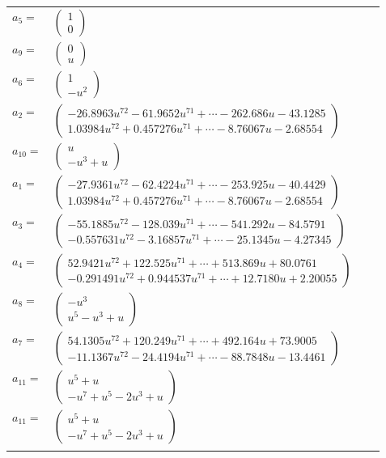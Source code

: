 \documentclass[1p]{elsarticle_modified}
\theoremstyle{definition}
\begin{document}
\begin{tabular}{m{7pt} m{180pt} m{7pt} m{180pt} }
\flushright $a_{5}=$&$\begin{pmatrix}1\\0\end{pmatrix}$ \\
\flushright $a_{9}=$&$\begin{pmatrix}0\\u\end{pmatrix}$ \\
\flushright $a_{6}=$&$\begin{pmatrix}1\\- u^2\end{pmatrix}$ \\
\flushright $a_{2}=$&$\begin{pmatrix}-26.8963 u^{72}-61.9652 u^{71}+\cdots-262.686 u-43.1285\\1.03984 u^{72}+0.457276 u^{71}+\cdots-8.76067 u-2.68554\end{pmatrix}$ \\
\flushright $a_{10}=$&$\begin{pmatrix}u\\- u^3+u\end{pmatrix}$ \\
\flushright $a_{1}=$&$\begin{pmatrix}-27.9361 u^{72}-62.4224 u^{71}+\cdots-253.925 u-40.4429\\1.03984 u^{72}+0.457276 u^{71}+\cdots-8.76067 u-2.68554\end{pmatrix}$ \\
\flushright $a_{3}=$&$\begin{pmatrix}-55.1885 u^{72}-128.039 u^{71}+\cdots-541.292 u-84.5791\\-0.557631 u^{72}-3.16857 u^{71}+\cdots-25.1345 u-4.27345\end{pmatrix}$ \\
\flushright $a_{4}=$&$\begin{pmatrix}52.9421 u^{72}+122.525 u^{71}+\cdots+513.869 u+80.0761\\-0.291491 u^{72}+0.944537 u^{71}+\cdots+12.7180 u+2.20055\end{pmatrix}$ \\
\flushright $a_{8}=$&$\begin{pmatrix}- u^3\\u^5- u^3+u\end{pmatrix}$ \\
\flushright $a_{7}=$&$\begin{pmatrix}54.1305 u^{72}+120.249 u^{71}+\cdots+492.164 u+73.9005\\-11.1367 u^{72}-24.4194 u^{71}+\cdots-88.7848 u-13.4461\end{pmatrix}$ \\
\flushright $a_{11}=$&$\begin{pmatrix}u^5+u\\- u^7+u^5-2 u^3+u\end{pmatrix}$\\ \flushright $a_{11}=$&$\begin{pmatrix}u^5+u\\- u^7+u^5-2 u^3+u\end{pmatrix}$\\&\end{tabular}
\end{document}
